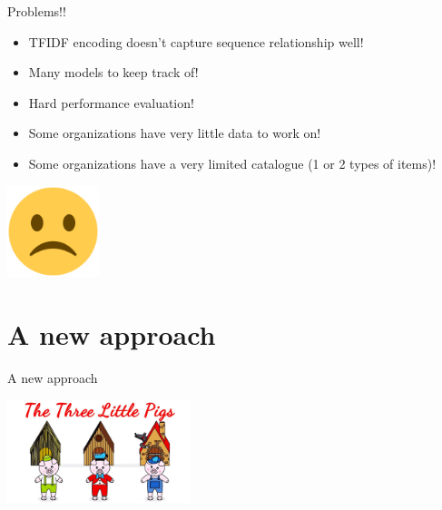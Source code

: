 \documentclass[9pt]{beamer}
\begin{document}
\begin{frame}{Problems!!}
	\begin{itemize}
		\item TFIDF encoding doesn't capture sequence relationship well! 
		\item Many models to keep track of!
		\item Hard performance evaluation!
		\item Some organizations have very little data to work on!  
		\item Some organizations have a very limited catalogue (1 or 2 types of items)!
	\end{itemize}

	\pause
	\begin{center}
		\includegraphics[width=0.2\textwidth]{imgs/sad.png}
	\end{center}
\end{frame}


\section{A new approach}
\begin{frame}{A new approach}
	\begin{center}
		\includegraphics[width=0.4\textwidth,height=!,trim={16cm 0 17.5cm 5cm},clip]{imgs/houses.jpg}
	\end{center}
\end{frame}
\end{document}
